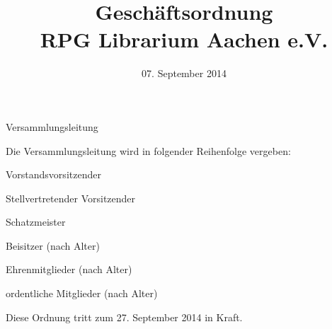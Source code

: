 \documentclass[11pt,a4paper,twoside,openany,article]{memoir}
\title{ Geschäftsordnung \\ RPG Librarium Aachen e.V.}
\date{07. September 2014}
\begin{document}
  \maketitle
  \sloppy

\begin{para} {Versammlungsleitung}
  \item Die Versammlungsleitung wird in folgender Reihenfolge vergeben:
  \begin{subpara}
    \item Vorstandsvorsitzender
    \item Stellvertretender Vorsitzender
    \item Schatzmeister
    \item Beisitzer (nach Alter)
    \item Ehrenmitglieder (nach Alter)
    \item ordentliche Mitglieder (nach Alter)
  \end{subpara}
\end{para}

\begin{changes}
  \item Diese Ordnung tritt zum 27. September 2014 in Kraft.
\end{changes}
\end{document}
